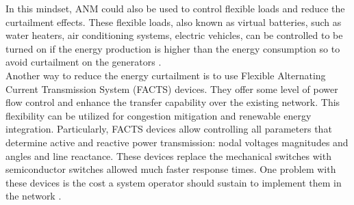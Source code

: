 In this mindset, \gls{ANM} could also be used to control flexible loads and reduce the curtailment effects. These flexible loads, also known as virtual batteries, such as water heaters, air conditioning systems, electric vehicles, can be controlled to be turned on if the energy production is higher than the energy consumption so to avoid curtailment on the generators \cite{flexibleloads}. \\
Another way to reduce the energy curtailment is to use Flexible Alternating Current Transmission System (\gls{FACTS}) devices. They offer some
level of power flow control and enhance the transfer capability over the existing network. This flexibility can be utilized for congestion
mitigation and renewable energy integration. Particularly, \gls{FACTS} devices allow controlling all parameters that determine active and reactive power transmission: nodal voltages magnitudes and angles and line reactance. These devices replace the mechanical switches with semiconductor switches allowed much faster response times. One problem with these devices is the cost a system operator should sustain to implement them in the network \cite{facts}.




